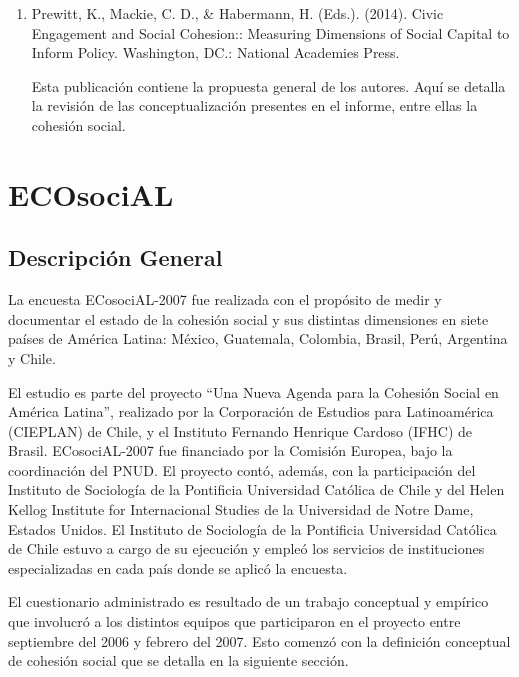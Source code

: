 \documentclass[
  12pt,
]{book}
\begin{document}
\begin{enumerate}
\def\labelenumi{\arabic{enumi}.}
\item
  Prewitt, K., Mackie, C. D., \& Habermann, H. (Eds.). (2014). Civic
  Engagement and Social Cohesion:: Measuring Dimensions of Social
  Capital to Inform Policy. Washington, DC.: National Academies
  Press.

  Esta publicación contiene la propuesta general de los autores. Aquí
  se detalla la revisión de las conceptualización presentes en el
  informe, entre ellas la cohesión social.
\end{enumerate}

\hypertarget{ecosocial}{%
\chapter{ECOsociAL}\label{ecosocial}}

\hypertarget{descripciuxf3n-general}{%
\section{Descripción General}\label{descripciuxf3n-general}}

La encuesta ECosociAL-2007 fue realizada con el propósito de medir y
documentar el estado de la cohesión social y sus distintas dimensiones
en siete países de América Latina: México, Guatemala, Colombia, Brasil,
Perú, Argentina y Chile.

El estudio es parte del proyecto ``Una Nueva Agenda para la Cohesión
Social en América Latina'', realizado por la Corporación de Estudios para
Latinoamérica (CIEPLAN) de Chile, y el Instituto Fernando Henrique
Cardoso (IFHC) de Brasil. ECosociAL-2007 fue financiado por la Comisión
Europea, bajo la coordinación del PNUD. El proyecto contó, además, con
la participación del Instituto de Sociología de la Pontificia
Universidad Católica de Chile y del Helen Kellog Institute for
Internacional Studies de la Universidad de Notre Dame, Estados Unidos.
El Instituto de Sociología de la Pontificia Universidad Católica de
Chile estuvo a cargo de su ejecución y empleó los servicios de
instituciones especializadas en cada país donde se aplicó la encuesta.

El cuestionario administrado es resultado de un trabajo conceptual y
empírico que involucró a los distintos equipos que participaron en el
proyecto entre septiembre del 2006 y febrero del 2007. Esto comenzó con
la definición conceptual de cohesión social que se detalla en la
siguiente sección.
\end{document}
